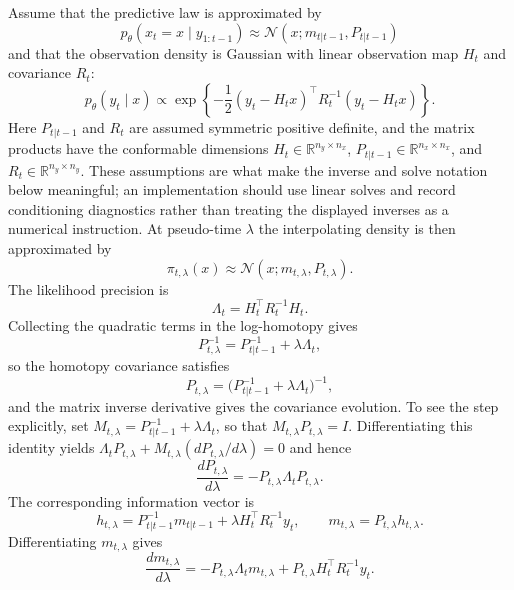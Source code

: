 Assume that the predictive law is approximated by
\[
  p_\theta(x_t=x \mid y_{1:t-1})
  \approx \mathcal N(x;m_{t|t-1},P_{t|t-1})
\]
and that the observation density is Gaussian with linear observation map
$H_t$ and covariance $R_t$:
\[
  p_\theta(y_t\mid x)
  \propto
  \exp\left\{
    -\frac{1}{2}(y_t-H_tx)^\top R_t^{-1}(y_t-H_tx)
  \right\}.
\]
Here $P_{t|t-1}$ and $R_t$ are assumed symmetric positive definite, and the
matrix products have the conformable dimensions
$H_t\in\mathbb R^{n_y\times n_x}$,
$P_{t|t-1}\in\mathbb R^{n_x\times n_x}$, and
$R_t\in\mathbb R^{n_y\times n_y}$.  These assumptions are what make the inverse
and solve notation below meaningful; an implementation should use linear solves
and record conditioning diagnostics rather than treating the displayed inverses
as a numerical instruction.
At pseudo-time $\lambda$ the interpolating density is then approximated by
\[
  \pi_{t,\lambda}(x) \approx \mathcal N(x; m_{t,\lambda}, P_{t,\lambda}).
\]
The likelihood precision is
\begin{equation}
\label{eq:bf-pff-likelihood-precision}
  \Lambda_t = H_t^\top R_t^{-1} H_t.
\end{equation}
Collecting the quadratic terms in the log-homotopy gives
\[
  P_{t,\lambda}^{-1}
  =
  P_{t|t-1}^{-1}+\lambda\Lambda_t,
\]
so the homotopy covariance satisfies
\begin{equation}
\label{eq:bf-pff-homotopy-covariance}
  P_{t,\lambda} = \bigl(P_{t|t-1}^{-1} + \lambda \Lambda_t\bigr)^{-1},
\end{equation}
and the matrix inverse derivative gives the covariance evolution.  To see the
step explicitly, set
$M_{t,\lambda}=P_{t|t-1}^{-1}+\lambda\Lambda_t$, so that
$M_{t,\lambda}P_{t,\lambda}=I$.  Differentiating this identity yields
$\Lambda_tP_{t,\lambda}+M_{t,\lambda}(dP_{t,\lambda}/d\lambda)=0$ and hence
\begin{equation}
\label{eq:bf-pff-homotopy-cov-derivative}
  \frac{dP_{t,\lambda}}{d\lambda}
  = - P_{t,\lambda} \Lambda_t P_{t,\lambda}.
\end{equation}
The corresponding information vector is
\[
  h_{t,\lambda}
  =
  P_{t|t-1}^{-1}m_{t|t-1}
  + \lambda H_t^\top R_t^{-1}y_t,
  \qquad
  m_{t,\lambda}=P_{t,\lambda}h_{t,\lambda}.
\]
Differentiating $m_{t,\lambda}$ gives
\[
  \frac{dm_{t,\lambda}}{d\lambda}
  =
  -P_{t,\lambda}\Lambda_t m_{t,\lambda}
  + P_{t,\lambda}H_t^\top R_t^{-1}y_t.
\]

